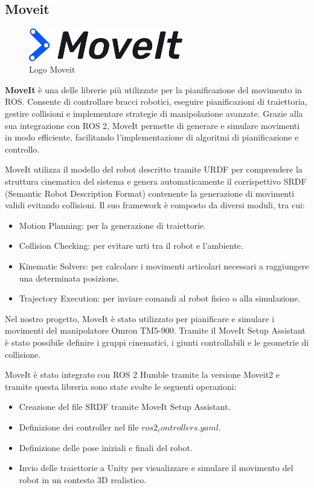 \documentclass[11pt]{report}
\begin{document}
\subsection{Moveit}
\label{sec:moveit}
\begin{figure}[H]
    \centering
    \includegraphics[width=0.6\textwidth]{images/moveit.png}
    \caption{Logo Moveit}
    \label{fig:moveit}
\end{figure}
\textbf{MoveIt} \cite{Moveit} \cite{Moveit_install} è una delle librerie più utilizzate per la pianificazione del movimento in ROS. Consente di controllare bracci robotici, eseguire pianificazioni di traiettoria, gestire collisioni e implementare strategie di manipolazione avanzate. Grazie alla sua integrazione con ROS 2, MoveIt permette di generare e simulare movimenti in modo efficiente, facilitando l'implementazione di algoritmi di pianificazione e controllo.

MoveIt utilizza il modello del robot descritto tramite URDF per comprendere la struttura cinematica del sistema e genera automaticamente il corrispettivo SRDF (Semantic Robot Description Format) contenente la generazione di movimenti validi evitando collisioni. Il suo framework è composto da diversi moduli, tra cui:
\begin{itemize}
    \item Motion Planning: per la generazione di traiettorie.
    \item Collision Checking: per evitare urti tra il robot e l'ambiente.
    \item Kinematic Solvers: per calcolare i movimenti articolari necessari a raggiungere una determinata posizione.
    \item Trajectory Execution: per inviare comandi al robot fisico o alla simulazione.
\end{itemize}

Nel nostro progetto, MoveIt è stato utilizzato per pianificare e simulare i movimenti del manipolatore Omron TM5-900. Tramite il MoveIt Setup Assistant è stato possibile definire i gruppi cinematici, i giunti controllabili e le geometrie di collisione.

MoveIt è stato integrato con ROS 2 Humble tramite la versione Moveit2 e tramite questa libreria sono state svolte le seguenti operazioni:
\begin{itemize}
    \item Creazione del file SRDF tramite MoveIt Setup Assistant.

    \item Definizione dei controller nel file $ros2_controllers.yaml$.

    \item Definizione delle pose iniziali e finali del robot.

    \item Invio delle traiettorie a Unity per visualizzare e simulare il movimento del robot in un contesto 3D realistico.
\end{itemize}
\end{document}
